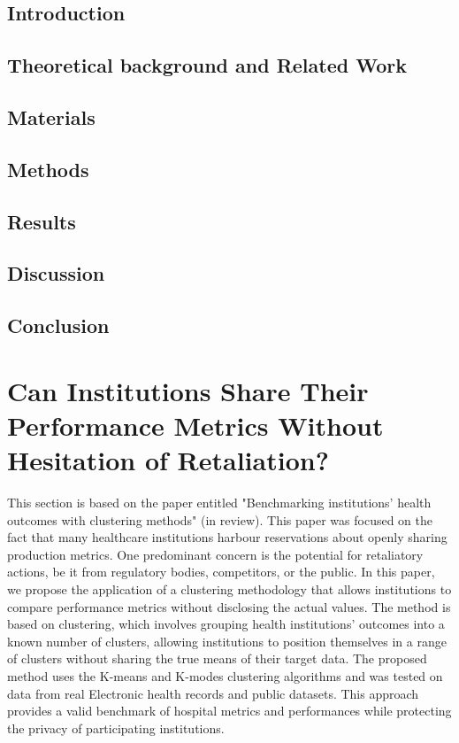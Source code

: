 \subsection{Introduction}

\subsection{Theoretical background and Related Work}

\subsection{Materials}

\subsection{Methods}

\subsection{Results}

\subsection{Discussion}

\subsection{Conclusion}



\section{Can Institutions Share Their Performance Metrics Without Hesitation of Retaliation?}\label{subsec:benchmark}
This section is based on the paper entitled "Benchmarking institutions' health outcomes with clustering methods" (in review). This paper was focused on the fact that many healthcare institutions harbour reservations about openly sharing production metrics. One predominant concern is the potential for retaliatory actions, be it from regulatory bodies, competitors, or the public. In this paper, we propose the application of a clustering methodology that allows institutions to compare performance metrics without disclosing the actual values. The method is based on clustering, which involves grouping health institutions' outcomes into a known number of clusters, allowing institutions to position themselves in a range of clusters without sharing the true means of their target data. The proposed method uses the K-means and K-modes clustering algorithms and was tested on data from real Electronic health records and public datasets. This approach provides a valid benchmark of hospital metrics and performances while protecting the privacy of participating institutions. 
